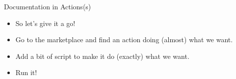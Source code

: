 \documentclass[usenames,dvipsnames]{beamer}
\begin{document}
\begin{frame}{Documentation in Actions(s)}
    \begin{itemize}[<+->]
        \item{}So let's give it a go!
        \item{}Go to the marketplace and find an action doing (almost) what we want.
        \item{}Add a bit of script to make it do (exactly) what we want.
        \item{}Run it!
    \end{itemize}

\end{frame}
\end{document}
